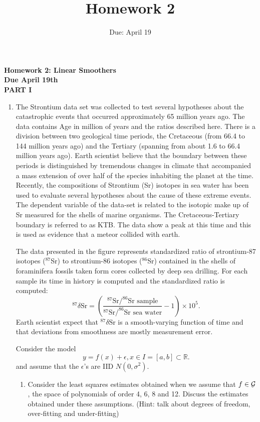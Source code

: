 \documentclass[12pt]{article}
\title{Homework 2}
\date{Due: April 19}
\begin{document}
\begin{center}
{\bf Homework 2: Linear Smoothers\\
Due April 19th\\ PART I}\end{center}

\begin{enumerate}
\item The Strontium data set was collected to test several hypotheses 
about the catastrophic events that occurred approximately 65 million
years ago. The data contains Age in million of years and the ratios
described here. There is a division between
two geological time periods, the Cretaceous (from 66.4 to 144 million
years ago) and the 
Tertiary (spanning from about 1.6 to 66.4 million years ago). Earth
scientist believe that the boundary between these periods is
distinguished by tremendous changes in climate that accompanied a mass
extension of over half of the species inhabiting the planet at the
time. Recently, the compositions of Strontium (Sr) isotopes in sea
water has been used to evaluate several hypotheses about the cause of
these extreme events. The dependent variable of the data-set is related to
the isotopic make up of Sr measured for the shells of marine
organisms. The Cretaceous-Tertiary boundary is referred to as
KTB. The   data show a 
peak  at this time and this is used as 
evidence that a meteor collided with earth. 

The data presented in the figure represents standardized ratio of
strontium-87 isotopes ($^{87}$Sr) to strontium-86 isotopes ($^{86}$Sr)
contained in the shells of foraminifera fossils taken form cores
collected by deep sea drilling. For each sample its time in history is
computed and  the standardized ratio is computed:
\[
^{87}\delta \mbox{Sr} = \left( \frac{ ^{87}\mbox{Sr}/^{86}\mbox{Sr sample}}{^{87}\mbox{Sr}/^{86}\mbox{Sr sea
    water}} - 1\right) \times 10^5.
\] 
Earth scientist expect that $^{87}\delta \mbox{Sr}$ is a smooth-varying
function of time and that deviations from smoothness are  mostly
measurement error. 

Consider the model 
\[
y = f(x) + \epsilon, x \in I=[a,b] \subset \mathbb{R}.
\]
and assume that the $\epsilon$'s are IID $N(0,\sigma^2)$. 

\begin{enumerate}
\item Consider the least squares estimates obtained when we assume
  that $f \in \cal  G$, the space of polynomials of order
  4, 6, 8 and 12. Discuss  the estimates obtained under these
  assumptions. (Hint: talk about 
  degrees of freedom, over-fitting and under-fitting)


\end{enumerate}
\end{enumerate}
\end{document}
